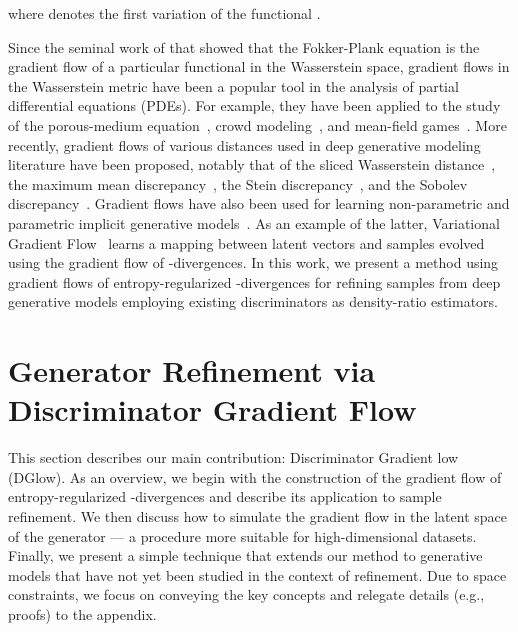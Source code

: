 \documentclass{article} \usepackage{iclr2021_conference,times}
\begin{document}
where  denotes the first variation of the functional . 

Since the seminal work of \citet{jordan1998variational} that showed that the Fokker-Plank equation is the gradient flow of a particular functional in the Wasserstein space, gradient flows in the Wasserstein metric have been a popular tool in the analysis of partial differential equations (PDEs). For example, they have been applied to the study of the porous-medium equation~\citep{otto2001geometry}, crowd modeling~\citep{maury2010macroscopic,maury2011handling}, and mean-field games~\citep{almulla2017two}. More recently, gradient flows of various distances used in deep generative modeling literature have been proposed, notably that of the sliced Wasserstein distance~\citep{liutkus2019sliced}, the 
maximum mean discrepancy~\citep{arbel2019maximum}, the Stein discrepancy~\citep{liu2017stein}, and the Sobolev discrepancy~\citep{mroueh2019sobolev}. Gradient flows have also been used for learning non-parametric and parametric implicit generative models~\citep{liutkus2019sliced,gao2019deep,gao2020learning}. As an example of the latter, Variational Gradient Flow~\citep{gao2019deep}  learns a mapping between latent vectors and samples evolved using the gradient flow of -divergences. In this work, we present a method using gradient flows of entropy-regularized -divergences for refining samples from deep generative models employing existing discriminators as density-ratio estimators.

 \vspace{-.8em}
\section{Generator Refinement via Discriminator Gradient Flow}
\vspace{-.8em}


This section describes our main contribution: Discriminator Gradient low (DGlow). As an overview, we begin with the construction of the gradient flow of entropy-regularized -divergences and describe its application to sample refinement. We then discuss how to simulate the gradient flow in the latent space of the generator --- a procedure more suitable for high-dimensional datasets. Finally, we present a simple technique that extends our method to generative models that have not yet been studied in the context of refinement. Due to space constraints, we focus on conveying the key concepts and relegate details (e.g., proofs) to the appendix.
\end{document}
